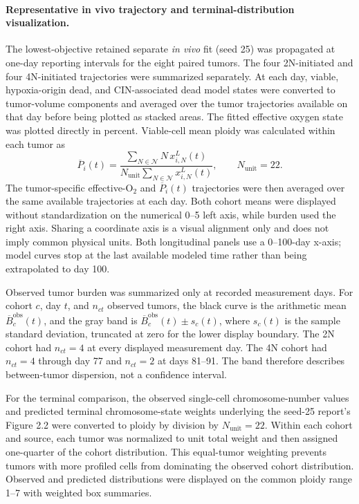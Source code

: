 \documentclass[11pt]{article}
\begin{document}
\paragraph{Representative in vivo trajectory and terminal-distribution visualization.}
The lowest-objective retained separate \textit{in vivo} fit (seed 25) was propagated at one-day reporting intervals for the eight paired tumors. The four 2N-initiated and four 4N-initiated trajectories were summarized separately. At each day, viable, hypoxia-origin dead, and CIN-associated dead model states were converted to tumor-volume components and averaged over the tumor trajectories available on that day before being plotted as stacked areas. The fitted effective oxygen state was plotted directly in percent. Viable-cell mean ploidy was calculated within each tumor as
\begin{equation}
\overline{P}_i(t)=
\frac{\sum_{N\in\mathcal N}N\,x^L_{i,N}(t)}
{N_{\mathrm{unit}}\sum_{N\in\mathcal N}x^L_{i,N}(t)},
\qquad N_{\mathrm{unit}}=22.
\label{eq:appendix_invivo_mean_ploidy_display}
\end{equation}
The tumor-specific effective-O$_2$ and \(\overline{P}_i(t)\) trajectories were then averaged over the same available trajectories at each day. Both cohort means were displayed without standardization on the numerical 0--5 left axis, while burden used the right axis. Sharing a coordinate axis is a visual alignment only and does not imply common physical units. Both longitudinal panels use a 0--100-day x-axis; model curves stop at the last available modeled time rather than being extrapolated to day 100.

Observed tumor burden was summarized only at recorded measurement days. For cohort \(c\), day \(t\), and \(n_{ct}\) observed tumors, the black curve is the arithmetic mean \(\overline{B}^{\mathrm{obs}}_c(t)\), and the gray band is \(\overline{B}^{\mathrm{obs}}_c(t)\pm s_c(t)\), where \(s_c(t)\) is the sample standard deviation, truncated at zero for the lower display boundary. The 2N cohort had \(n_{ct}=4\) at every displayed measurement day. The 4N cohort had \(n_{ct}=4\) through day 77 and \(n_{ct}=2\) at days 81--91. The band therefore describes between-tumor dispersion, not a confidence interval.

For the terminal comparison, the observed single-cell chromosome-number values and predicted terminal chromosome-state weights underlying the seed-25 report's Figure 2.2 were converted to ploidy by division by \(N_{\mathrm{unit}}=22\). Within each cohort and source, each tumor was normalized to unit total weight and then assigned one-quarter of the cohort distribution. This equal-tumor weighting prevents tumors with more profiled cells from dominating the observed cohort distribution. Observed and predicted distributions were displayed on the common ploidy range 1--7 with weighted box summaries.
\end{document}
